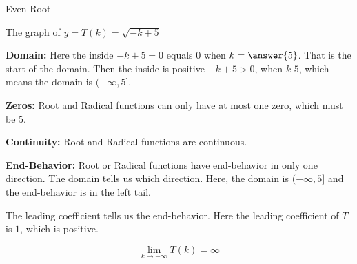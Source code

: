 \documentclass{ximera}
\begin{document}
\begin{example} Even Root

The graph of $y = T(k) = \sqrt{-k+5}$


\begin{image}
\end{image}


\textbf{Domain:} 
Here the inside $-k+5=0$ equals $0$ when $k=\answer{5}$.  That is the start of the domain.  Then the inside is positive $-k+5>0$, when $k$ \wordChoice{\choice[correct]{$<$} \choice {$>$}}  $5$, which means the domain is $(-\infty,5]$.


\textbf{Zeros:}  Root and Radical functions can only have at most one zero, which must be $5$.


\textbf{Continuity:} Root and Radical functions are continuous. 


\textbf{End-Behavior:} Root or Radical functions have end-behavior in only one direction. The domain tells us which direction. Here, the domain is $(-\infty,5]$ and the end-behavior is in the left tail.

The leading coefficient tells us the end-behavior. Here the leading coefficient of $T$ is $1$, which is positive.


\[  \lim\limits_{k \to -\infty} T(k) = \infty   \]








\end{example}
\end{document}
